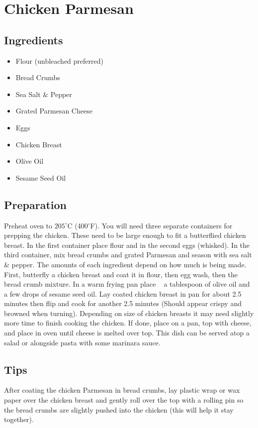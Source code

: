 \thispagestyle{fancy}
\section{Chicken Parmesan}
\AddToShipoutPicture*{\ChickenParm}

\subsection*{Ingredients}
\begin{multicols}{3}
	\begin{itemize}
		\item Flour (unbleached preferred)
		\item Bread Crumbs
		\item Sea Salt \& Pepper
		\item Grated Parmesan Cheese
		\item Eggs
		\item Chicken Breast
		\item Olive Oil
		\item Sesame Seed Oil
	\end{itemize}
\end{multicols}

\subsection*{Preparation}

Preheat oven to $205^\circ$C (400$^\circ$F). You will need three separate containers for prepping the chicken.  These need to be large enough to fit a butterflied chicken breast. In the first container place flour and in the second eggs (whisked). In the third container, mix bread crumbs and grated Parmesan and season with sea salt \& pepper. The amounts of each ingredient depend on how much is being made. First, butterfly a chicken breast and coat it in flour, then egg wash, then the bread crumb mixture. In a warm frying pan place ~ a tablespoon of olive oil and a few drops of sesame seed oil. Lay coated chicken breast in pan for about 2.5 minutes then flip and cook for another 2.5 minutes (Should appear crispy and browned when turning). Depending on size of chicken breasts it may need slightly more time to finish cooking the chicken. If done, place on a pan, top with cheese, and place in oven until cheese is melted over top. This dish can be served atop a salad or alongside pasta with some marinara sauce.

\subsection*{Tips}

After coating the chicken Parmesan in bread crumbs, lay plastic wrap or wax paper over the chicken breast and gently roll over the top with a rolling pin so the bread crumbs are slightly pushed into the chicken (this will help it stay together).